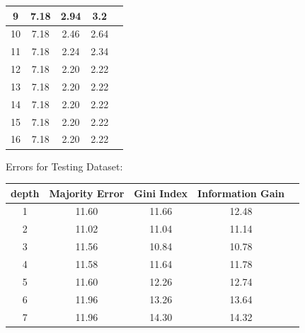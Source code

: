 \documentclass[12pt, fullpage,letterpaper]{article}
\begin{document}
\begin{enumerate}
\begin{enumerate}
\begin{table}[h]
\begin{tabular}{cccc|c}
		9 & 7.18 & 2.94 & 3.2 \\ \hline
		10 & 7.18 & 2.46 & 2.64 \\ \hline
		11 & 7.18 & 2.24 & 2.34\\ \hline
		12 & 7.18 & 2.20 & 2.22\\ \hline
		13 & 7.18 & 2.20 & 2.22\\ \hline
		14 & 7.18 & 2.20 & 2.22\\ \hline
		15 & 7.18 & 2.20 & 2.22\\ \hline
		16 & 7.18 & 2.20 & 2.22\\ \hline
	\end{tabular}
\end{table}

Errors for Testing Dataset:
\newline
\newline
\newline
\newline
\newline
\newline
\newline
\newline
\newline
\newline
\newline
\newline
\newline
\newline
\newline
\newline
\newline
\newline
\newline
\newline
\newline
 \begin{table}[h]
	\centering
	\begin{tabular}{cccc|c}
		depth & Majority Error & Gini Index & Information Gain\\ 
		\hline\hline
		1 & 11.60 & 11.66 & 12.48  \\ \hline
		2 & 11.02 & 11.04 & 11.14 \\ \hline
		3 & 11.56 & 10.84 & 10.78 \\ \hline
		4 & 11.58 & 11.64 & 11.78 \\ \hline
		5 & 11.60 & 12.26 & 12.74\\ \hline
		6 & 11.96 & 13.26 & 13.64\\ \hline
		7 & 11.96 & 14.30 & 14.32 \\ \hline

\end{tabular}
\end{table}
\end{enumerate}
\end{enumerate}
\end{document}
